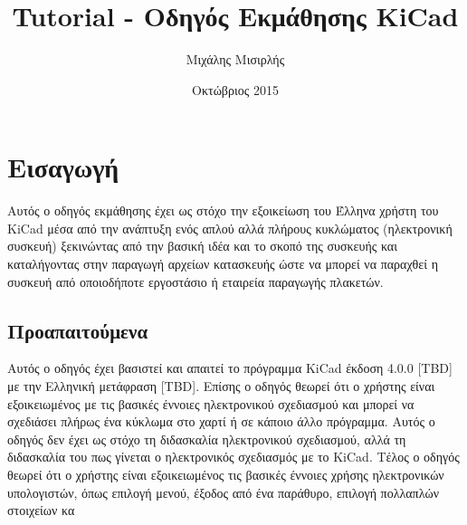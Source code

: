 \documentclass[a4paper]{article}
\title{Tutorial - Οδηγός Εκμάθησης KiCad}
\author{Μιχάλης Μισιρλής}
\date{Οκτώβριος 2015}
\begin{document}
\maketitle

\section{Εισαγωγή}
Αυτός ο οδηγός εκμάθησης έχει ως στόχο την εξοικείωση του Έλληνα χρήστη του KiCad μέσα από την ανάπτυξη ενός απλού αλλά πλήρους κυκλώματος (ηλεκτρονική συσκευή) ξεκινώντας από την βασική ιδέα και το σκοπό της συσκευής και καταλήγοντας στην παραγωγή αρχείων κατασκευής ώστε να μπορεί να παραχθεί η συσκευή από οποιοδήποτε εργοστάσιο ή εταιρεία παραγωγής πλακετών.

\subsection{Προαπαιτούμενα}
\label{sec:prereq}
Αυτός ο οδηγός έχει βασιστεί και απαιτεί το πρόγραμμα KiCad έκδοση 4.0.0 [TBD] με την Ελληνική μετάφραση [TBD]. Επίσης ο οδηγός θεωρεί ότι ο χρήστης είναι εξοικειωμένος με τις βασικές έννοιες ηλεκτρονικού σχεδιασμού και μπορεί να σχεδιάσει πλήρως ένα κύκλωμα στο χαρτί ή σε κάποιο άλλο πρόγραμμα. Αυτός ο οδηγός δεν έχει ως στόχο τη διδασκαλία ηλεκτρονικού σχεδιασμού, αλλά τη διδασκαλία του πως γίνεται ο ηλεκτρονικός σχεδιασμός με το KiCad.
Τέλος ο οδηγός θεωρεί ότι ο χρήστης είναι εξοικειωμένος τις βασικές έννοιες χρήσης ηλεκτρονικών υπολογιστών, όπως επιλογή μενού, έξοδος από ένα παράθυρο, επιλογή πολλαπλών στοιχείων κα
\end{document}
